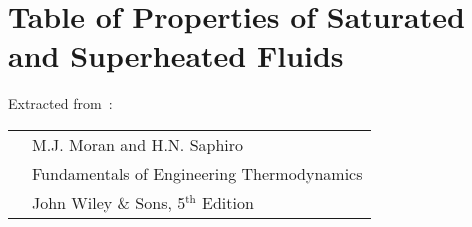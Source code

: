 
\chapter{Table of Properties of Saturated and Superheated Fluids}

Extracted from~\cite{Moran_Book}:\\
  \begin{tabular}{c l}
     \hspace{1cm} & M.J. Moran and H.N. Saphiro \\
                  & Fundamentals of Engineering Thermodynamics \\
                  & John Wiley $\&$ Sons, 5$^{\text{th}}$ Edition  \\
  \end{tabular}

  
